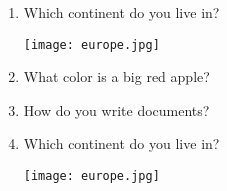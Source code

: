 \documentclass[12pt,onside,a4paper,article]{memoir}
\begin{document}
\begin{enumerate}
\setcounter{page}{1}

\item{Which continent do you live in?}
\begin{flushright}
\end{flushright}
\begin{flushleft}
\texttt{[image: europe.jpg]}
\end{flushleft}
\vspace{5cm}

\item{What color is a big red apple?}
\begin{flushright}
\end{flushright}
\item{How do you write documents?}
\begin{flushright}
\end{flushright}
\item{Which continent do you live in?}
\begin{flushright}
\end{flushright}
\begin{flushleft}
\texttt{[image: europe.jpg]}
\end{flushleft}
\vspace{5cm}


\end{enumerate}
\end{document}
